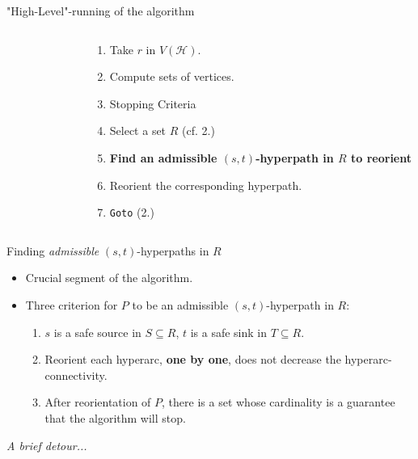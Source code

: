 \documentclass[10pt, aspectratio=43]{beamer}
\begin{document}
\begin{frame}{"High-Level"-running of the algorithm}
\begin{columns}
\begin{column}{0.5\textwidth}
\begin{figure}[H]
\begin{tikzpicture}
					\end{tikzpicture}
				\end{figure}
			\end{column}
			\hfill
			\begin{column}{0.5\textwidth}
				\begin{enumerate}
					\item <alert@2> Take $r$ in $V(\mathcal{H})$.
					\item <alert@3,7,11,19> Compute sets of vertices.
					\item <alert@20> Stopping Criteria
					\item <alert@4,8,12> Select a set $R$ (cf. 2.)
					\item <alert@5,9,13> \textbf<21>{Find an admissible $(s, t)$-hyperpath in $R$ to reorient}
					\item <alert@6,10,14-18> Reorient the corresponding hyperpath.
					\item <alert@7,11,19> \texttt{Goto} (2.)
				\end{enumerate}
			\end{column}
		\end{columns}	
	\end{frame}

	\begin{frame}{Finding \textit{admissible} $(s, t)$-hyperpaths in $R$}
		\begin{itemize}
			\item<1-> Crucial segment of the algorithm.
			\item<2-> Three criterion for $P$ to be an admissible $(s, t)$-hyperpath in $R$:
			\begin{enumerate}
				\item<3-> $s$ is a {\color{alizarin}safe source} in $S\subseteq{R}$, $t$ is a {\color{alizarin}safe sink} in $T\subseteq{R}$.
				\item<4-> Reorient each hyperarc, \textbf{one by one}, does not decrease the hyperarc-connectivity.
				\item<5-> After reorientation of $P$, there is a set whose cardinality is a guarantee that the algorithm will stop.
			\end{enumerate}
		\end{itemize}

		\begin{flushright}
			\textit{A brief detour...}
		\end{flushright}
	\end{frame}
\end{document}
